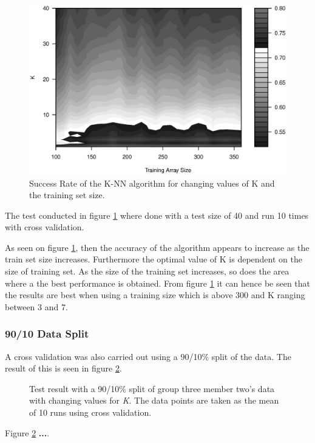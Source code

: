 \begin{figure}[H]
\centering
\includegraphics[width = 13cm]{graphics/graph_G3M1_10_10}
\caption{Success Rate of the K-NN algorithm for changing values of K and the training set size.}
\label{fig:personDependent_contour}
\end{figure}

The test conducted in figure \ref{fig:personDependent_contour} where done with a test size of 40 and run 10 times with cross validation.

As seen on figure \ref{fig:personDependent_contour}, then the accuracy of the algorithm appears to increase as the train set size increases.
Furthermore the optimal value of K is dependent on the size of training set. 
As the size of the training set increases, so does the area where a the best performance is obtained.
From figure \ref{fig:personDependent_contour} it can hence be seen that the results are best when using a training size which is above 300 and K ranging between 3 and 7.


\subsubsection{90/10 Data Split}
A cross validation was also carried out using a 90/10\% split of the data. 
The result of this is seen in figure \ref{fig:PersonDependent_9010}.


\begin{figure}[H]
\centering
\caption{Test result with a 90/10\% split of group three member two's data with changing values for \textit{K}. The data points are taken as the mean of 10 runs using cross validation.}
\label{fig:PersonDependent_9010}
\end{figure}

Figure \ref{fig:PersonDependent_9010} \textbf{...}.


